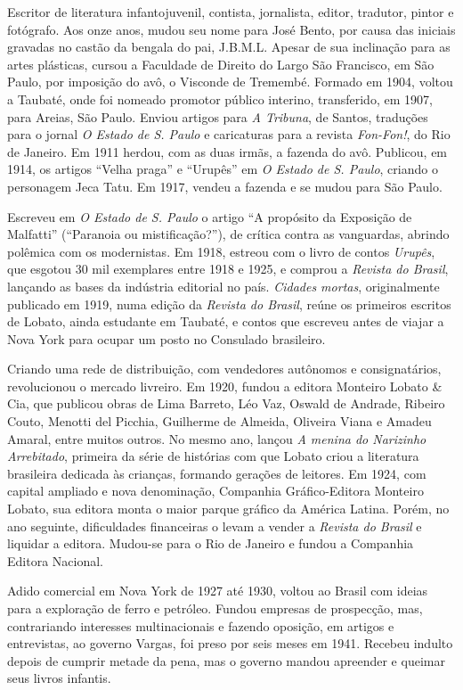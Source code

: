 \documentclass[11pt]{extarticle}
\begin{document}
Escritor de literatura infantojuvenil, contista, jornalista, editor,
tradutor, pintor e fotógrafo. Aos onze anos, mudou seu nome para José
Bento, por causa das iniciais gravadas no castão da bengala do pai,
J.B.M.L. Apesar de sua inclinação para as artes plásticas, cursou a
Faculdade de Direito do Largo São Francisco, em São Paulo, por imposição
do avô, o Visconde de Tremembé. Formado em 1904, voltou a Taubaté, onde
foi nomeado promotor público interino, transferido, em 1907, para
Areias, São Paulo. Enviou artigos para \emph{A Tribuna}, de Santos,
traduções para o jornal \emph{O Estado de S. Paulo} e caricaturas para a
revista \emph{Fon-Fon!}, do Rio de Janeiro. Em 1911 herdou, com as duas
irmãs, a fazenda do avô. Publicou, em 1914, os artigos ``Velha praga'' e
``Urupês'' em \emph{O Estado de S. Paulo}, criando o personagem Jeca
Tatu. Em 1917, vendeu a fazenda e se mudou para São Paulo.

Escreveu em \emph{O Estado de S. Paulo} o artigo ``A propósito da
Exposição de Malfatti'' (``Paranoia ou mistificação?''), de crítica
contra as vanguardas, abrindo polêmica com os modernistas. Em 1918,
estreou com o livro de contos \emph{Urupês}, que esgotou 30 mil
exemplares entre 1918 e 1925, e comprou a \emph{Revista do Brasil},
lançando as bases da indústria editorial no país. \emph{Cidades mortas},
originalmente publicado em 1919, numa edição da \emph{Revista do
Brasil}, reúne os primeiros escritos de Lobato, ainda estudante em
Taubaté, e contos que escreveu antes de viajar a Nova York para ocupar
um posto no Consulado brasileiro.

Criando uma rede de distribuição, com vendedores autônomos e
consignatários, revolucionou o mercado livreiro. Em 1920, fundou a
editora Monteiro Lobato \& Cia, que publicou obras de Lima Barreto, Léo
Vaz, Oswald de Andrade, Ribeiro Couto, Menotti del Picchia, Guilherme de
Almeida, Oliveira Viana e Amadeu Amaral, entre muitos outros. No mesmo
ano, lançou \emph{A menina do Narizinho Arrebitado}, primeira da série
de histórias com que Lobato criou a literatura brasileira dedicada às
crianças, formando gerações de leitores. Em 1924, com capital ampliado e
nova denominação, Companhia Gráfico-Editora Monteiro Lobato, sua editora
monta o maior parque gráfico da América Latina. Porém, no ano seguinte,
dificuldades financeiras o levam a vender a \emph{Revista do Brasil} e
liquidar a editora. Mudou-se para o Rio de Janeiro e fundou a Companhia
Editora Nacional.

Adido comercial em Nova York de 1927 até 1930, voltou ao Brasil com
ideias para a exploração de ferro e petróleo. Fundou empresas de
prospecção, mas, contrariando interesses multinacionais e fazendo
oposição, em artigos e entrevistas, ao governo Vargas, foi preso por
seis meses em 1941. Recebeu indulto depois de cumprir metade da pena,
mas o governo mandou apreender e queimar seus livros infantis.
\end{document}
